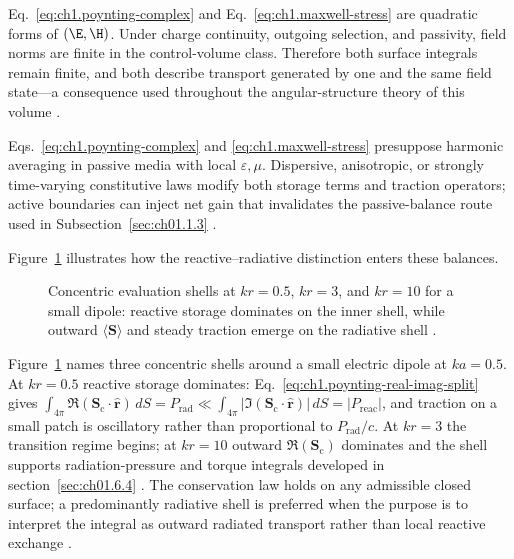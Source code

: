 Eq.~\eqref{eq:ch1.poynting-complex} and Eq.~\eqref{eq:ch1.maxwell-stress} are
quadratic forms of \((\E,\H)\). Under charge continuity, outgoing selection, and passivity, field norms are
finite in the control-volume class. Therefore both surface integrals remain finite,
and both describe transport generated by one and the same field state---a consequence used throughout the angular-structure theory of this volume \cite{stratton1941}.

Eqs.~\eqref{eq:ch1.poynting-complex} and
\eqref{eq:ch1.maxwell-stress} presuppose harmonic averaging in passive media with
local \(\varepsilon,\mu\). Dispersive, anisotropic, or strongly time-varying
constitutive laws modify both storage terms and traction operators; active boundaries
can inject net gain that invalidates the passive-balance route used in
Subsection~\ref{sec:ch01.1.3}
\cite{stratton1941}.



Figure~\ref{fig:ch1.wp-reactive-vs-radiative} illustrates how the reactive--radiative distinction enters these balances.
\begin{figure}[!htbp]
\centering
\VolIPhysFig{\VolIPhysReactiveVsRadiative}
\caption{Concentric evaluation shells at $kr=0.5$, $kr=3$, and $kr=10$ for a small dipole: reactive storage dominates on the inner shell, while outward $\langle\mathbf{S}\rangle$ and steady traction emerge on the radiative shell \cite{stratton1941,chu1948}.}
\label{fig:ch1.wp-reactive-vs-radiative}
\end{figure}

Figure~\ref{fig:ch1.wp-reactive-vs-radiative} names three concentric shells around a small electric dipole at $ka=0.5$. At $kr=0.5$ reactive
storage dominates: Eq.~\eqref{eq:ch1.poynting-real-imag-split} gives
\(\int_{4\pi}\Re(\mathbf{S}_\mathrm{c}\cdot\hat{\mathbf{r}})\,dS=P_{\mathrm{rad}}\ll
\int_{4\pi}|\Im(\mathbf{S}_\mathrm{c}\cdot\hat{\mathbf{r}})|\,dS=|P_{\mathrm{reac}}|\), and traction on a
small patch is oscillatory rather than proportional to \(P_{\mathrm{rad}}/c\). At
$kr=3$ the transition regime begins; at
$kr=10$ outward $\Re(\mathbf{S}_\mathrm{c})$ dominates and the shell supports radiation-pressure and torque integrals developed in
section~\ref{sec:ch01.6.4} \cite{stratton1941,chu1948}.
The conservation law holds on any admissible closed surface; a predominantly radiative shell is preferred when the purpose is to interpret the integral as outward radiated transport rather than local reactive exchange \cite{chu1948,stratton1941}.

